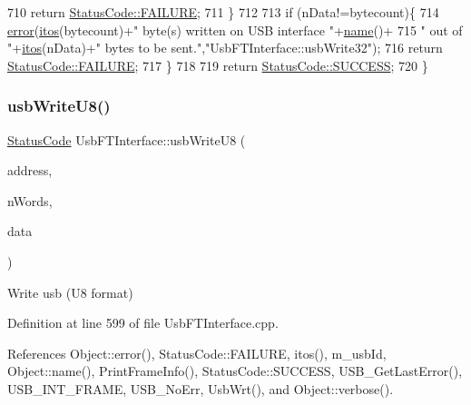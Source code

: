 \begin{DoxyCode}
710     \textcolor{keywordflow}{return} \hyperlink{classStatusCode_a6f565cbeadc76d14c72f047e5e85eb4ba3da73d4c469762eb9d3c960368252b26}{StatusCode::FAILURE};
711   \}
712 
713   \textcolor{keywordflow}{if} (nData!=bytecount)\{
714     \hyperlink{classObject_a204a95f57818c0f811933917a30eff45}{error}(\hyperlink{Tools_8h_af330027dbdafb9a30768b3613c553e60}{itos}(bytecount)+\textcolor{stringliteral}{" byte(s) written on USB interface "}+\hyperlink{classObject_a300f4c05dd468c7bb8b3c968868443c1}{name}()+
715             \textcolor{stringliteral}{" out of "}+\hyperlink{Tools_8h_af330027dbdafb9a30768b3613c553e60}{itos}(nData)+\textcolor{stringliteral}{" bytes to be sent."},\textcolor{stringliteral}{"UsbFTInterface::usbWrite32"});
716     \textcolor{keywordflow}{return} \hyperlink{classStatusCode_a6f565cbeadc76d14c72f047e5e85eb4ba3da73d4c469762eb9d3c960368252b26}{StatusCode::FAILURE};    
717   \}
718 
719   \textcolor{keywordflow}{return} \hyperlink{classStatusCode_a6f565cbeadc76d14c72f047e5e85eb4badd0da38d3ba0d922efd1f4619bc37ad8}{StatusCode::SUCCESS};  
720 \}
\end{DoxyCode}
\mbox{\label{classUsbFTInterface_a8aeebce6a10aa88c19cfa663b47b389a}} 
\subsubsection{\texorpdfstring{usb\+Write\+U8()}{usbWriteU8()}}
{\footnotesize\ttfamily \hyperlink{classStatusCode}{Status\+Code} Usb\+F\+T\+Interface\+::usb\+Write\+U8 (\begin{DoxyParamCaption}\item[{unsigned long int}]{address,  }\item[{unsigned long int}]{n\+Words,  }\item[{unsigned char $\ast$}]{data }\end{DoxyParamCaption})}

Write usb (U8 format) 

Definition at line 599 of file Usb\+F\+T\+Interface.\+cpp.



References Object\+::error(), Status\+Code\+::\+F\+A\+I\+L\+U\+RE, itos(), m\+\_\+usb\+Id, Object\+::name(), Print\+Frame\+Info(), Status\+Code\+::\+S\+U\+C\+C\+E\+SS, U\+S\+B\+\_\+\+Get\+Last\+Error(), U\+S\+B\+\_\+\+I\+N\+T\+\_\+\+F\+R\+A\+ME, U\+S\+B\+\_\+\+No\+Err, Usb\+Wrt(), and Object\+::verbose().



